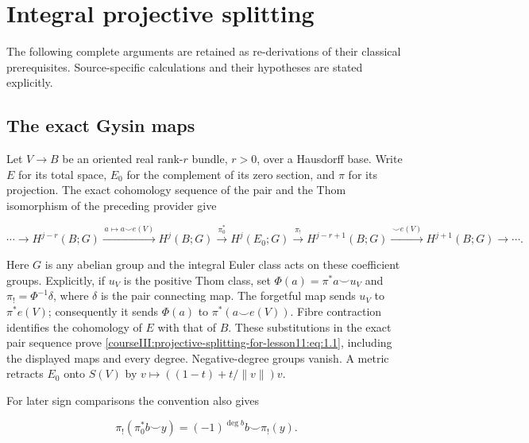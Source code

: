 \section{Integral projective splitting}\label{courseIII:projective-splitting-for-lesson11:section}

The following complete arguments are retained as re-derivations of their classical prerequisites. Source-specific calculations and their hypotheses are stated explicitly.

\subsection{The exact Gysin maps}
\label{courseIII:projective-splitting-for-lesson11:gysin-maps}

\label{courseIII:projective-splitting-for-lesson11:section-1}\label{courseIII:projective-splitting-for-lesson11:CG-S6-PROJECTIVE-1}

Let \(V\to B\) be an oriented real rank-\(r\) bundle, \(r>0\), over a Hausdorff base. Write \(E\) for its total space, \(E_0\) for the complement of its zero section, and \(\pi\) for its projection. The exact cohomology sequence of the pair and the Thom isomorphism of the preceding provider give

\begin{equation}
\cdots\longrightarrow H^{j-r}(B;G)
\xrightarrow{\,a\mapsto a\smile e(V)\,}H^j(B;G)
\xrightarrow{\pi_0^*}H^j(E_0;G)
\xrightarrow{\pi_!}H^{j-r+1}(B;G)
\xrightarrow{\,\smile e(V)\,}H^{j+1}(B;G)\longrightarrow\cdots .
\label{courseIII:projective-splitting-for-lesson11:eq:1.1}
\end{equation}

Here \(G\) is any abelian group and the integral Euler class acts on these coefficient groups. Explicitly, if \(u_V\) is the positive Thom class, set \(\Phi(a)=\pi^*a\smile u_V\) and \(\pi_!=\Phi^{-1}\delta\), where \(\delta\) is the pair connecting map. The forgetful map sends \(u_V\) to \(\pi^*e(V)\); consequently it sends \(\Phi(a)\) to \(\pi^*(a\smile e(V))\). Fibre contraction identifies the cohomology of \(E\) with that of \(B\). These substitutions in the exact pair sequence prove \eqref{courseIII:projective-splitting-for-lesson11:eq:1.1}, including the displayed maps and every degree. Negative-degree groups vanish. A metric retracts \(E_0\) onto \(S(V)\) by \(v\mapsto((1-t)+t/\|v\|)v\).

For later sign comparisons the convention also gives

\begin{equation}
\pi_!(\pi_0^*b\smile y)=(-1)^{\deg b}b\smile\pi_!(y).
\label{courseIII:projective-splitting-for-lesson11:eq:1.2}
\end{equation}

